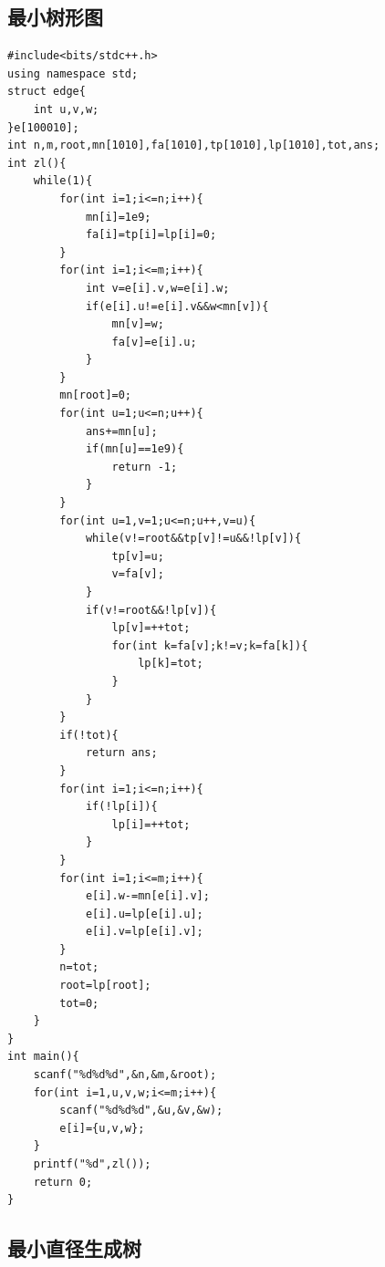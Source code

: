 \documentclass[11pt,a4paper]{ctexart}
\begin{document}
\subsection{最小树形图}

\begin{lstlisting}
#include<bits/stdc++.h>
using namespace std;
struct edge{
	int u,v,w;
}e[100010];
int n,m,root,mn[1010],fa[1010],tp[1010],lp[1010],tot,ans;
int zl(){
	while(1){
		for(int i=1;i<=n;i++){
			mn[i]=1e9;
			fa[i]=tp[i]=lp[i]=0;
		}
		for(int i=1;i<=m;i++){
			int v=e[i].v,w=e[i].w;
			if(e[i].u!=e[i].v&&w<mn[v]){
				mn[v]=w;
				fa[v]=e[i].u;
			}
		}
		mn[root]=0;
		for(int u=1;u<=n;u++){
			ans+=mn[u];
			if(mn[u]==1e9){
				return -1;
			}
		}
		for(int u=1,v=1;u<=n;u++,v=u){
			while(v!=root&&tp[v]!=u&&!lp[v]){
				tp[v]=u;
				v=fa[v];
			}
			if(v!=root&&!lp[v]){
				lp[v]=++tot;
				for(int k=fa[v];k!=v;k=fa[k]){
					lp[k]=tot;
				}
			}
		}
		if(!tot){
			return ans;
		}
		for(int i=1;i<=n;i++){
			if(!lp[i]){
				lp[i]=++tot;
			}
		}
		for(int i=1;i<=m;i++){
			e[i].w-=mn[e[i].v];
			e[i].u=lp[e[i].u];
			e[i].v=lp[e[i].v];
		}
		n=tot;
		root=lp[root];
		tot=0;
	}
}
int main(){
	scanf("%d%d%d",&n,&m,&root);
	for(int i=1,u,v,w;i<=m;i++){
		scanf("%d%d%d",&u,&v,&w);
		e[i]={u,v,w};
	}
	printf("%d",zl());
	return 0;
}
\end{lstlisting}

\subsection{最小直径生成树}
\end{document}
